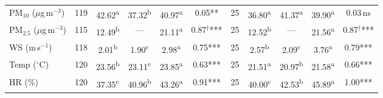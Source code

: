 \begin{table}[htbp]
{\begin{tabular}{l rcccc rcccc}
$\mathrm{PM_{10}}$ ($\mu$g\,m$^{-3}$) & 119 & 42.62\textsuperscript{a} & 37.32\textsuperscript{b} & 40.97\textsuperscript{a} & 0.05** & 25 & 36.80\textsuperscript{a} & 41.37\textsuperscript{a} & 39.90\textsuperscript{a} & 0.03\,ns \\
$\mathrm{PM_{2.5}}$ ($\mu$g\,m$^{-3}$) & 115 & 12.49\textsuperscript{b} & --- & 21.11\textsuperscript{a} & 0.87$^{\dagger}$*** & 25 & 12.52\textsuperscript{b} & --- & 21.56\textsuperscript{a} & 0.87$^{\dagger}$*** \\
WS (m\,s$^{-1}$) & 118 & 2.01\textsuperscript{b} & 1.90\textsuperscript{c} & 2.98\textsuperscript{a} & 0.75*** & 25 & 2.57\textsuperscript{b} & 2.09\textsuperscript{c} & 3.76\textsuperscript{a} & 0.79*** \\
Temp ($^{\circ}$C) & 120 & 23.56\textsuperscript{b} & 23.11\textsuperscript{c} & 23.85\textsuperscript{a} & 0.63*** & 25 & 21.51\textsuperscript{a} & 20.97\textsuperscript{b} & 21.58\textsuperscript{a} & 0.66*** \\
HR (\%) & 120 & 37.35\textsuperscript{c} & 40.96\textsuperscript{b} & 43.26\textsuperscript{a} & 0.91*** & 25 & 40.00\textsuperscript{c} & 42.53\textsuperscript{b} & 45.89\textsuperscript{a} & 1.00*** \\
\bottomrule
\end{tabular}}
\end{table}